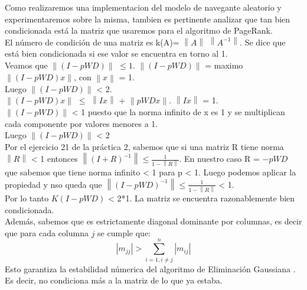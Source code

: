 Como realizaremos una implementacion del modelo de navegante aleatorio y experimentaremos sobre la misma, tambien es pertinente analizar que tan bien condicionada está la matriz que usaremos para el algoritmo de PageRank. \\

El número de condición de una matriz es k(A)= $\left\lVert A \right\rVert$ $\left\lVert A^{-1} \right\rVert$. Se dice que está bien condicionada si ese valor se encuentra en torno al 1.\\

Veamos que $\left\lVert (I-pWD) \right\rVert$  $\leq 1$. 
$\left\lVert (I-pWD) \right\rVert$ = maximo $\left\lVert (I-pWD)x \right\rVert$, con 
 $\left\lVert x \right\rVert$ = 1. \\
 Luego $\left\lVert (I-pWD) \right\rVert$ < 2.\\

$\left\lVert (I-pWD)x \right\rVert$ $\leq$ $\left\lVert Ix \right\rVert$ + $\left\lVert pWDx \right\rVert$.
 $\left\lVert Ix \right\rVert$ = 1.  \\
  $\left\lVert (I-pWD) \right\rVert$ < 1 puesto que la norma infinito de x es 1 y se multiplican cada componente por valores menores a 1. \\
 Luego $\left\lVert (I-pWD) \right\rVert$ < 2  \\

Por el ejercicio 21 de la práctica 2, sabemos que si una matriz R tiene norma $\left\lVert R \right\rVert$ < 1 entonces $ \left\lVert (I+R)^{-1} \right\rVert \leq \frac{1}{1- \left\lVert R \right\rVert}$. 
En nuestro caso R = $-pWD$ que sabemos que tiene norma infinito < 1 para p < 1. Luego podemos aplicar la propiedad y nso queda que $ \left\lVert (I-pWD)^{-1} \right\rVert \leq \frac{1}{1- \left\lVert R \right\rVert}$ < 1. \\

Por lo tanto $K(I-pWD)$ < 2*1. La matriz se encuentra razonablemente bien condicionada. \\

Además, sabemos que es estrictamente diagonal dominante por columnas, es decir que para cada columna $j$ se cumple que:
\begin{equation}
    |m_{jj}| > \sum_{i=1,i \neq j}^n |m_{ij}|
\end{equation}
Esto garantiza la estabilidad númerica del algoritmo de Eliminación Gaussiana \cite{burden}. Es decir, no condiciona más a la matriz de lo que ya estaba. \\

